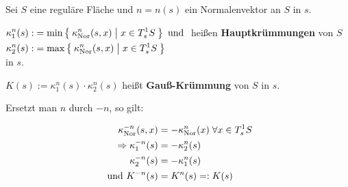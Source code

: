 \begin{definition}%
    Sei $S$ eine reguläre Fläche und $n=n(s)$ ein Normalenvektor an 
    $S$ in $s$.

    \begin{defenum}
        \item $\begin{aligned}[t]
                \kappa^n_1(s) :&= \min \Set{\kappa_{\textnormal{Nor}}^n(s,x) | x \in T_s^1 S} \text{ und }\\
                \kappa^n_2(s) :&= \max \Set{\kappa_{\textnormal{Nor}}^n(s,x) | x \in T_s^1 S}
              \end{aligned}$
              heißen \textbf{Hauptkrümmungen} von $S$ in $s$.
        \item $K(s) := \kappa_1^n(s) \cdot \kappa_2^n(s)$ heißt
              \textbf{Gauß-Krümmung} von $S$ in $s$.
    \end{defenum}
\end{definition}

\begin{bemerkung}%
    Ersetzt man $n$ durch $-n$, so gilt: 

    \begin{align*}
                \kappa_{\textnormal{Nor}}^{-n}(s, x) &= - \kappa_{\textnormal{Nor}}^n(x)\; \forall x \in T_s^1 S\\
        \Rightarrow \kappa_1^{-n}(s) &= - \kappa_2^n(s)\\
                    \kappa_2^{-n}(s) &= - \kappa_1^n (s)\\
              \text{ und } K^{-n}(s) &= K^n(s) =: K(s)
    \end{align*}
\end{bemerkung}

